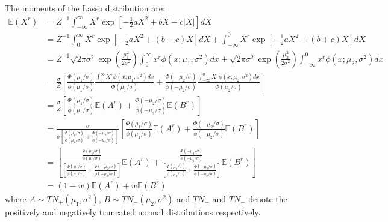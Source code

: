 \documentclass[11pt]{article}
\begin{document}
The moments of the Lasso distribution are:
$$
\begin{array}{rl}
\mathbb{E}(X^r)
& = Z^{-1} \int_{-\infty}^\infty X^r \exp\left[ -\tfrac{1}{2}aX^2 + bX - c|X| \right] dX
\\ [2ex]
&  
= Z^{-1}  \int_0^\infty   X^r \exp\left[ -\tfrac{1}{2}aX^2 + (b - c)X \right] dX
+ \int_{-\infty}^0 X^r \exp\left[ -\tfrac{1}{2}aX^2 + (b + c)X \right] dX
\\ [2ex]
&  
= Z^{-1}  \sqrt{2\pi\sigma^2}
 \exp\left(  \frac{\mu_1^2}{2\sigma^2} \right) \int_0^\infty x^r \phi(x;\mu_1,\sigma^2) dx
 +   \sqrt{2\pi\sigma^2}   \exp\left(  \frac{\mu_2^2}{2\sigma^2} \right) \int_{-\infty}^0 x^r \phi(x;\mu_2,\sigma^2) dx

\\ [2ex]
& 
= \frac{\sigma}{Z} \left[  
 \frac{\Phi(\mu_1/\sigma)}{\phi(\mu_1/\sigma)} \frac{\int_0^\infty X^r \phi(x;\mu_1,\sigma^2) dx}{\Phi(\mu_1/\sigma)}
+  \frac{\Phi(-\mu_2/\sigma)}{\phi(-\mu_2/\sigma)}  \frac{\int_{-\infty}^0 X^r \phi(x;\mu_2,\sigma^2) dx}{\Phi(\mu_2/\sigma)}
\right] 

\\ [4ex]
&  
= \frac{\sigma}{Z} \left[  
 \frac{\Phi(\mu_1/\sigma)}{\phi(\mu_1/\sigma)} 
 \mathbb{E}( A^r )
+ \frac{\Phi(-\mu_2/\sigma)}{\phi(-\mu_2/\sigma)}  \mathbb{E}( B^r )
\right] 

\\ [4ex]
&  
= \frac{\sigma}{\sigma \left[ \frac{\Phi(\mu_1/\sigma)}{\phi(\mu_1/\sigma)}
+ \frac{\Phi(-\mu_2/\sigma)}{\phi(-\mu_2/\sigma)}  \right]} \left[  
 \frac{\Phi(\mu_1/\sigma)}{\phi(\mu_1/\sigma)} 
 \mathbb{E}( A^r )
+  \frac{\Phi(-\mu_2/\sigma)}{\phi(-\mu_2/\sigma)}  \mathbb{E}( B^r )
\right] 
\\ [4ex]
&  
= \left[ \frac{\frac{\Phi(\mu_1/\sigma)}{\phi(\mu_1/\sigma)}}{\left[ \frac{\Phi(\mu_1/\sigma)}{\phi(\mu_1/\sigma)}
+ \frac{\Phi(-\mu_2/\sigma)}{\phi(-\mu_2/\sigma)}  \right]}    
 \mathbb{E}( A^r )
+  \frac{\frac{\Phi(-\mu_2/\sigma)}{\phi(-\mu_2/\sigma)}}{\left[ \frac{\Phi(\mu_1/\sigma)}{\phi(\mu_1/\sigma)}
+ \frac{\Phi(-\mu_2/\sigma)}{\phi(-\mu_2/\sigma)}  \right]}   \mathbb{E}( B^r )
\right] 
\\ [4ex]
&  
=
 (1 - w) \mathbb{E}(A^r) +  w \mathbb{E}(B^r)

\end{array} 
$$
where $A\sim TN_+(\mu_1,\sigma^2)$, $B\sim TN_-(\mu_2,\sigma^2)$ and $TN_+$ and
 $TN_-$ denote the positively and negatively truncated
 normal distributions respectively.
\end{document}
